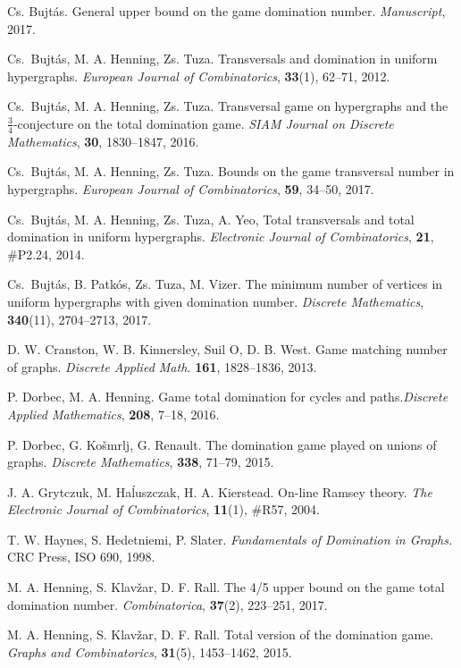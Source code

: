 \documentclass[12pt]{article}
\begin{document}
\begin{thebibliography}{99}
 Cs. Bujt\'as. General upper bound on the game domination number.  \textit{Manuscript}, 2017.

  Cs.\ Bujt\'as, M. A. Henning, Zs. Tuza. 
  Transversals and domination in uniform hypergraphs. {\it European Journal of Combinatorics}, {\bfseries 33}(1), 62--71, 2012.
  
 Cs.\ Bujt\'as, M. A. Henning, Zs. Tuza.
Transversal game on hypergraphs and the $\frac{3}{4}$-conjecture on the total domination game.
 {\it SIAM Journal on Discrete Mathematics}, {\bfseries 30}, 1830--1847, 2016.

 Cs.\ Bujt\'as, M. A. Henning, Zs. Tuza.
  Bounds on the game transversal number in hypergraphs.
  {\it European Journal of Combinatorics}, {\bfseries 59}, 34--50, 2017.

  Cs.\ Bujt\'as, M. A. Henning, Zs. Tuza, A. Yeo, Total transversals and total domination in uniform hypergraphs. {\it Electronic Journal of Combinatorics}, {\bfseries 21}, \#P2.24, 2014.

 Cs.\ Bujt\'as, B. Patk\'os, Zs. Tuza, M. Vizer. 
The minimum number of vertices in uniform hypergraphs with given domination number. {\it Discrete Mathematics}, \textbf{340}(11), 2704--2713, 2017.

 D. W. Cranston, W. B. Kinnersley, Suil O, D. B. West. Game matching number of graphs. \textit{Discrete Applied Math.} \textbf{161}, 1828--1836, 2013.

 P. Dorbec, M. A. Henning.
Game total domination for cycles and paths.\textit{Discrete Applied Mathematics}, \textbf{208}, 7--18, 2016.

 P. Dorbec, G. Ko\v smrlj, G. Renault. 
The domination game played on unions of graphs.
\textit{Discrete Mathematics}, \textbf{338}, 71--79, 2015.

 J. A. Grytczuk, M. Ha\'luszczak, H. A. Kierstead. On-line Ramsey theory. \textit{The Electronic Journal of Combinatorics}, \textbf{11}(1), \#R57, 2004.

 T. W. Haynes, S. Hedetniemi, P. Slater. 
  \textit{Fundamentals of Domination in Graphs.} CRC Press,
  ISO 690,	1998.

 M. A. Henning, S. Klav\v{z}ar, D. F. Rall. The 4/5 upper bound on the game total domination number. \textit{Combinatorica}, \textbf{37}(2), 223--251, 2017.

 M. A. Henning, S. Klav\v{z}ar, D. F. Rall. Total version of the domination game. \textit{Graphs and Combinatorics}, \textbf{31}(5), 1453--1462, 2015.  
  

\end{thebibliography}
\end{document}
